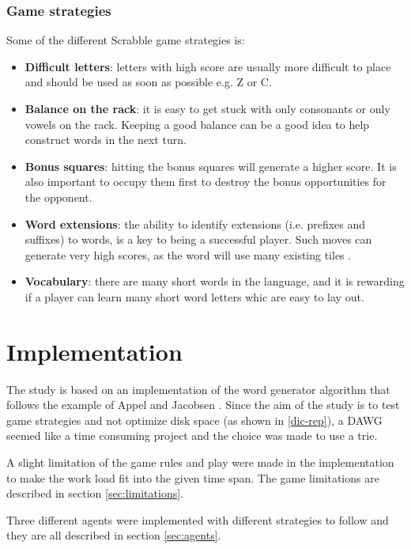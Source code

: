 \documentclass[a4paper, 12pt]{report}
\begin{document}
\subsection{Game strategies}
\label{sec:strategies}
Some of the different Scrabble game strategies is:

\begin{itemize}
\item {\bf Difficult letters}: letters with high score are usually more difficult to place and should be used as soon as possible e.g. Z or C.
\item {\bf Balance on the rack}: it is easy to get stuck with only consonants or only vowels on the rack. Keeping a good balance can be a good idea to help construct words in the next turn.
\item {\bf Bonus squares}: hitting the bonus squares will generate a higher score. It is also important to occupy them first to destroy the bonus opportunities for the opponent.
\item {\bf Word extensions}: the ability to identify extensions (i.e. prefixes and suffixes) to words, is a key to being a successful player. Such moves can generate very high scores, as the word will use many existing tiles \cite{perfectgame}.
\item {\bf Vocabulary}: there are many short words in the language, and it is rewarding if a player can learn many short word letters whic are easy to lay out.
\end{itemize}





\chapter{Implementation}
The study is based on an implementation of the word generator algorithm that follows the example of Appel and Jacobsen \cite{fastest}. Since the aim of the study is to test game strategies and not optimize disk space (as shown in \ref{dic-rep}), a DAWG seemed like a time consuming project and the choice was made to use a trie.

A slight limitation of the game rules and play were made in the implementation to make the work load fit into the given time span. The game limitations are described in section \ref{sec:limitations}.

Three different agents were implemented with different strategies to follow and they are all described in section \ref{sec:agents}.
\end{document}

